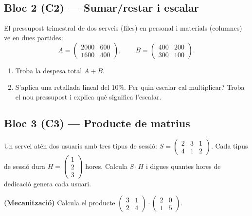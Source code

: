 \subsection{Bloc 2 (C2) — Sumar/restar i escalar}

\begin{exercicis}
\begin{exlist}
  \item El pressupost trimestral de dos serveis (files) en personal i materials
        (columnes) ve en dues partides:
        \[ A=\begin{pmatrix} 2000 & 600 \\ 1600 & 400 \end{pmatrix},\qquad
           B=\begin{pmatrix} 400 & 200 \\ 300 & 100 \end{pmatrix}. \]
        \begin{enumerate}[label=\alph*), leftmargin=1.6em, topsep=2pt]
          \item Troba la despesa total $A+B$.
          \item S'aplica una retallada lineal del $10\%$. Per quin escalar cal
                multiplicar? Troba el nou pressupost i explica què significa l'escalar.
        \end{enumerate}
\end{exlist}
\end{exercicis}

\subsection{Bloc 3 (C3) — Producte de matrius}

\begin{exercicis}
\begin{exlist}
  \item Un servei atén dos usuaris amb tres tipus de sessió:
        $S=\begin{pmatrix} 2 & 3 & 1 \\ 4 & 1 & 2 \end{pmatrix}$. Cada tipus de sessió
        dura $H=\begin{pmatrix} 1 \\ 2 \\ 3 \end{pmatrix}$ hores. Calcula $S\cdot H$ i
        digues quantes hores de dedicació genera cada usuari.
  \item \textbf{(Mecanització)} Calcula el producte
        $\begin{pmatrix} 3 & 1 \\ 2 & 4 \end{pmatrix}\cdot\begin{pmatrix} 2 & 0 \\ 1 & 5 \end{pmatrix}$.
\end{exlist}
\end{exercicis}

